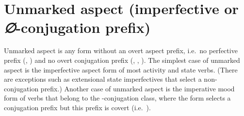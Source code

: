 \documentclass[12pt,letterpaper,landscape,oneside,article]{memoir}
\begin{document}
\begin{multicols}{2}


\end{multicols}

\clearpage

\section{Unmarked aspect (imperfective or \textit{∅}-conjugation prefix)}

Unmarked aspect is any form without an overt aspect prefix, i.e.\ no perfective prefix (, ) and no overt conjugation prefix (, , ).
The simplest case of unmarked aspect is the imperfective aspect form of most activity and state verbs.
(There are exceptions such as extensional state imperfectives that select a non- conjugation prefix.)
Another case of unmarked aspect is the imperative mood form of verbs that belong to the -conjugation class, where the form selects a conjugation prefix but this prefix is covert (i.e.\ ).
\end{document}

